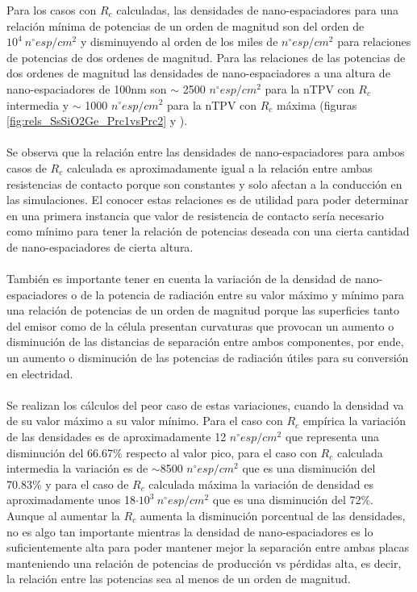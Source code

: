 Para los casos con $R_c$ calculadas, las densidades de nano-espaciadores para una relación mínima de potencias de un orden de magnitud son del orden de $10^4 \ n^{\circ}esp/cm^2$ y disminuyendo al orden de los miles de $n^{\circ}esp/cm^2$ para relaciones de potencias de dos ordenes de magnitud. Para las relaciones de las potencias de dos ordenes de magnitud las densidades de nano-espaciadores a una altura de nano-espaciadores de 100nm son $\sim$ 2500 $n^{\circ} esp/cm^2$ para la nTPV con $R_c$ intermedia y $\sim$ 1000 $n^{\circ} esp/cm^2$ para la nTPV con $R_c$ máxima (figuras \ref{fig:rels_SsSiO2Ge_Prc1vsPrc2}  y ).\\\\
Se observa que la relación entre las densidades de nano-espaciadores para ambos casos de $R_c$ calculada es aproximadamente igual a la relación entre ambas resistencias de contacto porque son constantes y solo afectan a la conducción en las simulaciones. El conocer estas relaciones es de utilidad para poder determinar en una primera instancia que valor de resistencia de contacto sería necesario como mínimo para tener la relación de potencias deseada con una cierta cantidad de nano-espaciadores de cierta altura.\\\\
También es importante tener en cuenta la variación de la densidad de nano-espaciadores o de la potencia de radiación entre su valor máximo y mínimo para una relación de potencias de un orden de magnitud porque las superficies tanto del emisor como de la célula presentan curvaturas que provocan un aumento o disminución de las distancias de separación entre ambos componentes, por ende, un aumento o disminución de las potencias de radiación útiles para su conversión en electridad.\\\\
Se realizan los cálculos del peor caso de estas variaciones, cuando la densidad va de su valor máximo a su valor mínimo. Para el caso con $R_c$ empírica la variación de las densidades  es de aproximadamente 12 $n^{\circ} esp/cm^2$ que representa una disminución del 66.67\% respecto al valor pico, para el caso con $R_c$ calculada intermedia la variación es de $\sim$8500 $n^{\circ} esp/cm^2$  que es una disminución del 70.83\% y para el caso de $R_c$ calculada máxima la variación de densidad es aproximadamente unos 18$\cdot 10^3 \ n^{\circ}esp/cm^2$ que es una disminución del 72\%. Aunque al aumentar la $R_c$ aumenta la disminución porcentual de las densidades, no es algo tan importante mientras la densidad de nano-espaciadores es lo suficientemente alta para poder mantener mejor la separación entre ambas placas manteniendo una relación de potencias de producción vs pérdidas alta, es decir, la relación entre las potencias sea al menos de un orden de magnitud.\\\\

